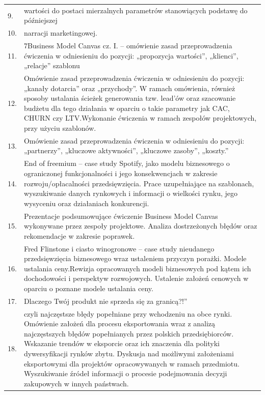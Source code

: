 \documentclass[12pt, a4paper]{article}
\begin{document}
{\begin{longtable}{m{1.5cm}m{14.5cm}}
  \rowcolor{tableRowLight} 9. & wartości do postaci mierzalnych parametrów stanowiących podstawę do późniejszej \\
  \rowcolor{tableRowAlt} 10. & narracji marketingowej. \\
  \rowcolor{tableRowLight} 11. & 7Business Model Canvas cz. I. – omówienie zasad przeprowadzenia ćwiczenia w odniesieniu do pozycji: „propozycja wartości”, „klienci”, „relacje” szablonu \\
  \rowcolor{tableRowAlt} 12. & Omówienie zasad przeprowadzenia ćwiczenia w odniesieniu do pozycji: „kanały dotarcia” oraz „przychody”.  W ramach omówienia, również sposoby ustalania ścieżek generowania tzw. lead’ów oraz szacowanie budżetu  dla tego działania w oparciu o takie parametry jak CAC, CHURN czy LTV.Wykonanie ćwiczenia w ramach zespołów projektowych, przy użyciu szablonów. \\
  \rowcolor{tableRowLight} 13. & Omówienie zasad przeprowadzenia ćwiczenia w odniesieniu do pozycji: „partnerzy”, „kluczowe aktywności”, „kluczowe zasoby”, „koszty.” \\
  \rowcolor{tableRowAlt} 14. & End of freemium – case study Spotify, jako modelu biznesowego o ograniczonej funkcjonalności i jego konsekwencjach w zakresie rozwoju/opłacalności przedsięwzięcia.   Prace uzupełniające na szablonach, wyszukiwanie danych rynkowych i informacji o wielkości rynku, jego wysyceniu oraz działaniach konkurencji. \\
  \rowcolor{tableRowLight} 15. & Prezentacje podsumowujące ćwiczenie Business Model Canvas wykonywane przez zespoły projektowe. Analiza dostrzeżonych błędów oraz rekomendacje w zakresie poprawek. \\
  \rowcolor{tableRowAlt} 16. & Fred Flinstone i ciasto winogronowe – case study nieudanego przedsięwzięcia biznesowego wraz ustaleniem przyczyn porażki. Modele ustalania ceny.Rewizja opracowanych modeli biznesowych pod kątem ich dochodowości i perspektyw rozwojowych. Ustalenie założeń cenowych w oparciu o poznane modele ustalania ceny. \\
  \rowcolor{tableRowLight} 17. & Dlaczego Twój produkt nie sprzeda się za granicą?!” \\
  \rowcolor{tableRowAlt} 18. & czyli najczęstsze błędy popełniane przy wchodzeniu na obce rynki. Omówienie założeń dla procesu eksportowania wraz z analizą najczęstszych błędów popełnianych przez polskich przedsiębiorców. Wskazanie trendów w eksporcie oraz ich znaczenia dla polityki dywersyfikacji rynków zbytu.   Dyskusja nad możliwymi założeniami eksportowymi dla projektów opracowywanych w ramach przedmiotu. Wyszukiwanie źródeł informacji o procesie podejmowania decyzji zakupowych w innych państwach. \\

\end{longtable}}
\end{document}
